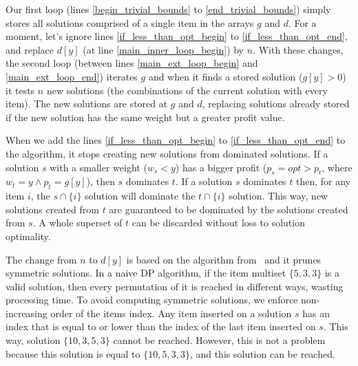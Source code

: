 \documentclass[runningheads,a4paper]{llncs}
\begin{document}
Our first loop (lines \ref{begin_trivial_bounds} to \ref{end_trivial_bounds}) simply stores all solutions comprised of a single item in the arrays \(g\) and \(d\). 
For a moment, let's ignore lines \ref{if_less_than_opt_begin} to \ref{if_less_than_opt_end}, and replace \(d[y]\) (at line \ref{main_inner_loop_begin}) by \(n\). 
With these changes, the second loop (between lines \ref{main_ext_loop_begin} and \ref{main_ext_loop_end}) 
iterates \(g\) and when it finds a stored solution (\(g[y] > 0\)) it tests \(n\) new solutions 
(the combinations of the current solution with every item). 
The new solutions are stored at \(g\) and \(d\), replacing solutions already stored if the new solution has the same weight but a greater profit value.

When we add the lines \ref{if_less_than_opt_begin} to \ref{if_less_than_opt_end} to the algorithm, it stops creating new solutions from dominated solutions. 
If a solution \(s\) with a smaller weight (\(w_s < y\)) has a bigger profit (\(p_s = opt > p_t\), where \(w_t = y \land p_t = g[y]\)), then \(s\) dominates \(t\). 
If a solution \(s\) dominates \(t\) then, for any item \(i\), the \(s \cap \{i\}\) solution will dominate the \(t \cap \{i\}\) solution. 
This way, new solutions created from \(t\) are guaranteed to be dominated by the solutions created from \(s\). 
A whole superset of \(t\) can be discarded without loss to solution optimality. 

The change from \(n\) to \(d[y]\) is based on the algorithm from~\cite{gar72} and it prunes symmetric solutions.
In a naive DP algorithm, if the item multiset \(\{5, 3, 3\}\) is a valid solution, then every permutation of it is reached in different ways, wasting processing time. 
To avoid computing symmetric solutions, we enforce non-increasing order of the items index. 
Any item inserted on a solution \(s\) has an index that is equal to or lower than the index of the last item inserted on \(s\). 
This way, solution \(\{10,3,5,3\}\) cannot be reached.
However, this is not a problem because this solution is equal to \(\{10, 5, 3, 3\}\), and this solution can be reached. 
\end{document}
